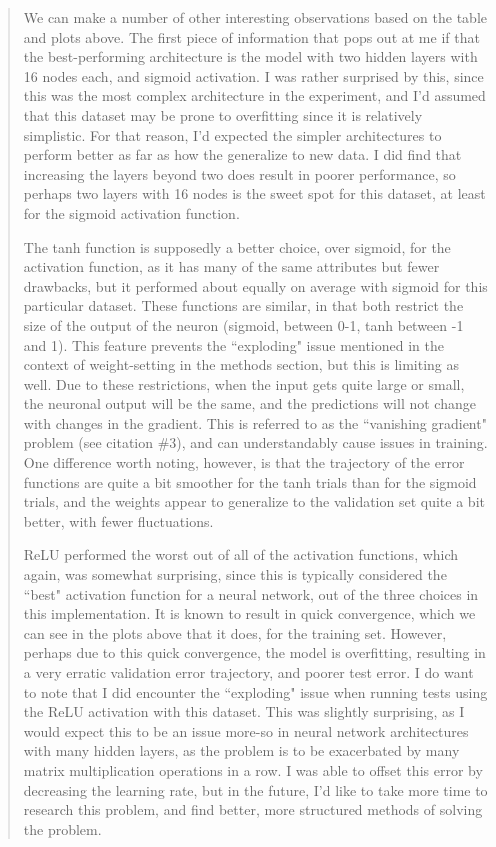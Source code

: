 \documentclass{article}
\begin{document}
\begin{quote}
	 We can make a number of other interesting observations based on the table and plots above. The first piece of information that pops out at me if that the best-performing architecture is the model with two hidden layers with 16 nodes each, and sigmoid activation. I was rather surprised by this, since this was the most complex architecture in the experiment, and I'd assumed that this dataset may be prone to overfitting since it is relatively simplistic. For that reason, I'd expected the simpler architectures to perform better as far as how the generalize to new data. I did find that increasing the layers beyond two does result in poorer performance, so perhaps two layers with 16 nodes is the sweet spot for this dataset, at least for the sigmoid activation function.
	 
	 The tanh function is supposedly a better choice, over sigmoid, for the activation function, as it has many of the same attributes but fewer drawbacks, but it performed about equally on average with sigmoid for this particular dataset. These functions are similar, in that both restrict the size of the output of the neuron (sigmoid, between 0-1, tanh between -1 and 1). This feature prevents the ``exploding"  issue mentioned in the context of weight-setting in the methods section, but this is limiting as well. Due to these restrictions, when the input gets quite large or small, the neuronal output will be the same, and the predictions will not change with changes in the gradient. This is referred to as the ``vanishing gradient" problem (see citation \#3), and can understandably cause issues in training. One difference worth noting, however, is that the trajectory of the error functions are quite a bit smoother for the tanh trials than for the sigmoid trials, and the weights appear to generalize to the validation set quite a bit better, with fewer fluctuations.
	 
	 ReLU performed the worst out of all of the activation functions, which again, was somewhat surprising, since this is typically considered the ``best" activation function for a neural network, out of the three choices in this implementation. It is known to result in quick convergence, which we can see in the plots above that it does, for the training set. However, perhaps due to this quick convergence, the model is overfitting, resulting in a very erratic validation error trajectory, and poorer test error. I do want to note that I did encounter the ``exploding" issue when running tests using the ReLU activation with this dataset. This was slightly surprising, as I would expect this to be an issue more-so in neural network architectures with many hidden layers, as the problem is to be exacerbated by many matrix multiplication operations in a row. I was able to offset this error by decreasing the learning rate, but in the future, I'd like to take more time to research this problem, and find better, more structured methods of solving the problem. 
	 

\end{quote}
\end{document}
